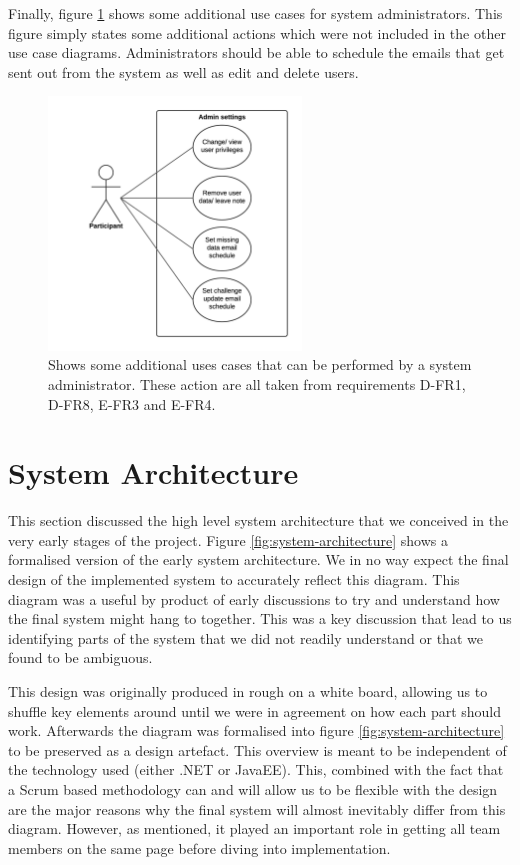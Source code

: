Finally, figure \ref{fig:use-case-admin-settings} shows some additional use cases for system administrators. This figure simply states some additional actions which were not included in the other use case diagrams. Administrators should be able to schedule the emails that get sent out from the system as well as edit and delete users.

\begin{figure}[H]
\centering
\includegraphics[width=0.6\textwidth]{../design/UML/UseCase/Admin-Settings.png}
\caption{Shows some additional uses cases that can be performed by a system administrator. These action are all taken from requirements D-FR1, D-FR8, E-FR3 and E-FR4.}
\label{fig:use-case-admin-settings}
\end{figure}

\section{System Architecture}
This section discussed the high level system architecture that we conceived in the very early stages of the project. Figure \ref{fig:system-architecture} shows a formalised version of the early system architecture. We in no way expect the final design of the implemented system to accurately reflect this diagram. This diagram was a useful by product of early discussions to try and understand how the final system might hang to together. This was a key discussion that lead to us identifying parts of the system that we did not readily understand or that we found to be ambiguous. 

This design was originally produced in rough on a white board, allowing us to  shuffle key elements around until we were in agreement on how each part should work. Afterwards the diagram was formalised into figure \ref{fig:system-architecture} to be preserved as a design artefact. This overview is meant to be independent of the technology used (either .NET or JavaEE). This, combined with the fact that a Scrum based methodology can and will allow us to be flexible with the design are the major reasons why the final system will almost inevitably differ from this diagram. However, as mentioned, it played an important role in getting all team members on the same page before diving into implementation.

